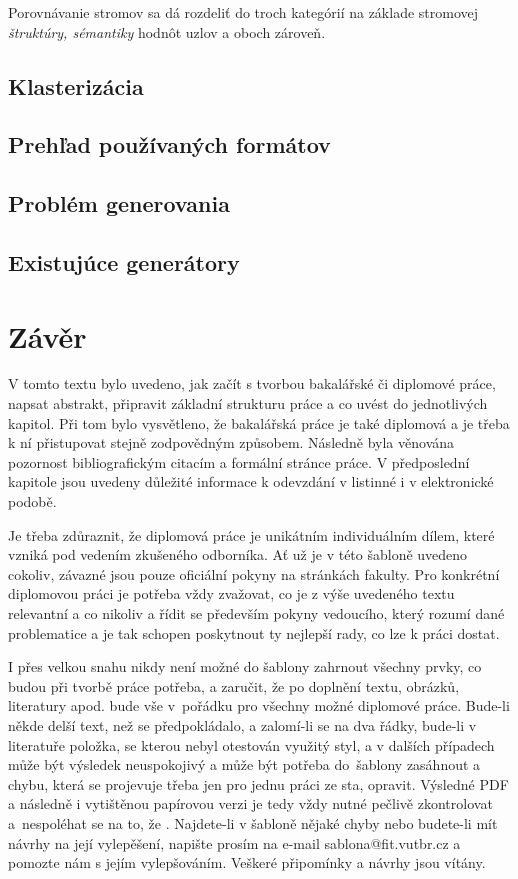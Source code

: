 Porovnávanie stromov sa dá rozdeliť do troch kategórií na základe stromovej \textit{štruktúry, sémantiky} hodnôt uzlov a oboch zároveň. 
\section{Klasterizácia}
\section{Prehľad používaných formátov}
\section{Problém generovania}
\section{Existujúce generátory}





\chapter{Závěr}
\label{zaver}

V tomto textu bylo uvedeno, jak začít s tvorbou bakalářské či diplomové práce, napsat abstrakt, připravit základní strukturu práce a co uvést do jednotlivých kapitol. Při tom bylo vysvětleno, že bakalářská práce je také diplomová a je třeba k ní přistupovat stejně zodpovědným způsobem. Následně byla věnována pozornost bibliografickým citacím a formální stránce práce. V předposlední kapitole jsou uvedeny důležité informace k odevzdání v listinné i v elektronické podobě.

Je třeba zdůraznit, že diplomová práce je unikátním individuálním dílem, které vzniká pod vedením zkušeného odborníka. Ať už je v této šabloně uvedeno cokoliv, závazné jsou pouze oficiální pokyny na stránkách fakulty. Pro konkrétní diplomovou práci je potřeba vždy zvažovat, co je z výše uvedeného textu relevantní a co nikoliv a řídit se především pokyny vedoucího, který rozumí dané problematice a je tak schopen poskytnout ty nejlepší rady, co lze k práci dostat.

I přes velkou snahu nikdy není možné do šablony zahrnout všechny prvky, co budou při tvorbě práce potřeba, a zaručit, že po doplnění textu, obrázků, literatury apod. bude vše v~pořádku pro všechny možné diplomové práce. Bude-li někde delší text, než se předpokládalo, a zalomí-li se na dva řádky, bude-li v literatuře položka, se kterou nebyl otestován využitý styl, a v dalších případech může být výsledek neuspokojivý a může být potřeba do~šablony zasáhnout a chybu, která se projevuje třeba jen pro jednu práci ze sta, opravit. Výsledné PDF a následně i vytištěnou papírovou verzi je tedy vždy nutné pečlivě zkontrolovat a~nespoléhat se na to, že . Najdete-li v šabloně nějaké chyby nebo budete-li mít návrhy na její vylepěšení, napište prosím na e-mail sablona@fit.vutbr.cz a pomozte nám s jejím vylepšováním. Veškeré připomínky a návrhy jsou vítány.

